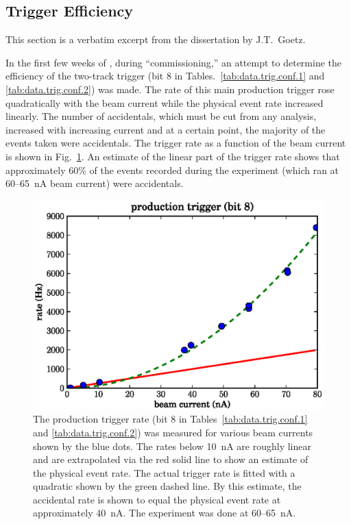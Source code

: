 \subsection{\label{sec:calib.trig.eff}Trigger Efficiency}

\begin{center} \color{OliveGreen}
This section is a verbatim excerpt from the dissertation by J.T.\ Goetz\cite{clas.thesis.goetz}.
\end{center}

In the first few weeks of , during ``commissioning,'' an attempt to determine the efficiency of the two-track trigger (bit 8 in Tables.~\ref{tab:data.trig.conf.1} and \ref{tab:data.trig.conf.2}) was made. The rate of this main production trigger rose quadratically with the beam current while the physical event rate increased linearly. The number of accidentals, which must be cut from any analysis, increased with increasing current and at a certain point, the majority of the events taken were accidentals. The trigger rate as a function of the beam current is shown in Fig.~\ref{fig:data.trig.eff}. An estimate of the linear part of the trigger rate shows that approximately 60\% of the events recorded during the  experiment (which ran at 60--65~nA beam current) were accidentals.

\begin{figure}\begin{center}
\includegraphics[width=0.6\columnwidth]{figures/calib/trig/trigger_study.eps}
\caption[Trigger Rate vs. Beam Current]{\label{fig:data.trig.eff}The production trigger rate (bit 8 in Tables~\ref{tab:data.trig.conf.1} and \ref{tab:data.trig.conf.2}) was measured for various beam currents shown by the blue dots. The rates below 10~nA are roughly linear and are extrapolated via the red solid line to show an estimate of the physical event rate. The actual trigger rate is fitted with a quadratic shown by the green dashed line. By this estimate, the accidental rate is shown to equal the physical event rate at approximately 40~nA. The  experiment was done at 60--65~nA.}
\end{center}\end{figure}

\FloatBarrier
